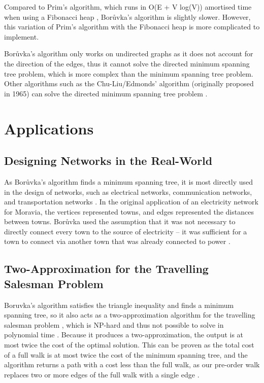 \documentclass[a4paper, 11pt]{article}
\begin{document}
Compared to Prim's algorithm, which runs in O(E + V log(V)) amortised time when using a Fibonacci heap \cite{fredman1987fibonacci}, Borůvka's algorithm is slightly slower. However, this variation of Prim's algorithm with the Fibonacci heap is more complicated to implement.

Borůvka's algorithm only works on undirected graphs as it does not account for the direction of the edges, thus it cannot solve the directed minimum spanning tree problem, which is more complex than the minimum spanning tree problem. Other algorithms such as the Chu-Liu/Edmonds' algorithm (originally proposed in 1965) can solve the directed minimum spanning tree problem \cite{gabow1986efficient}.

\section{Applications}

\subsection{Designing Networks in the Real-World}
As Borůvka's algorithm finds a minimum spanning tree, it is most directly used in the design of networks, such as electrical networks, communication networks, and transportation networks \cite{graham1985history}. In the original application of an electricity network for Moravia, the vertices represented towns, and edges represented the distances between towns. Borůvka used the assumption that it was not necessary to directly connect every town to the source of electricity -- it was sufficient for a town to connect via another town that was already connected to power \cite{nevsetvril2001otakar}.

\subsection{Two-Approximation for the Travelling Salesman Problem}
Boruvka's algorithm satisfies the triangle inequality and finds a minimum spanning tree, so it also acts as a two-approximation algorithm for the travelling salesman problem \cite{andreae1995performance}, which is NP-hard and thus not possible to solve in polynomial time \cite{junger1995traveling}. Because it produces a two-approximation, the output is at most twice the cost of the optimal solution. This can be proven as the total cost of a full walk is at most twice the cost of the minimum spanning tree, and the algorithm returns a path with a cost less than the full walk, as our pre-order walk replaces two or more edges of the full walk with a single edge \cite{andreae1995performance}.
\end{document}
